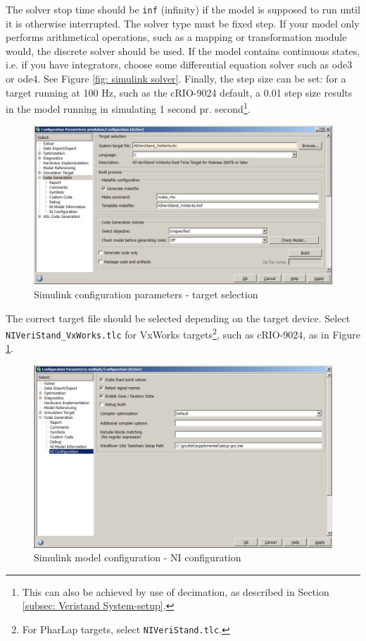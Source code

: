 \documentclass[a4paper,twoside,english]{report}
\begin{document}
The solver stop time should be \texttt{inf} (infinity) if the model
is supposed to run until it is otherwise interrupted. The solver type
must be fixed step. If your model only performs arithmetical operations,
such as a mapping or transformation module would, the discrete solver
should be used. If the model contains continuous states, i.e. if you
have integrators, choose some differential equation solver such as
ode3 or ode4. See Figure \ref{fig: simulink solver}. Finally, the
step size can be set: for a target running at 100 Hz, such as the
cRIO-9024 default, a 0.01 step size results in the model running in
simulating 1 second pr. second\footnote{This can also be achieved by use of decimation, as described in Section
\ref{subsec: Veristand System-setup}.}.

\begin{figure}[!h]
\centering \includegraphics[scale=0.45]{fig/simulink_settings_codegeneration}
\caption{Simulink configuration parameters - target selection}

\label{fig: simulink target selection} 
\end{figure}

The correct target file should be selected depending on the target
device. Select \texttt{NIVeriStand\_VxWorks.tlc} for VxWorks targets\footnote{For PharLap targets, select \texttt{NIVeriStand.tlc}.},
such as cRIO-9024, as in Figure \ref{fig: simulink target selection}.

\begin{figure}[!h]
\centering \includegraphics[scale=0.45]{fig/simulink_settings_ni} \caption{Simulink model configuration - NI configuration}

\label{fig: simulink NI configuration} 
\end{figure}
\end{document}
